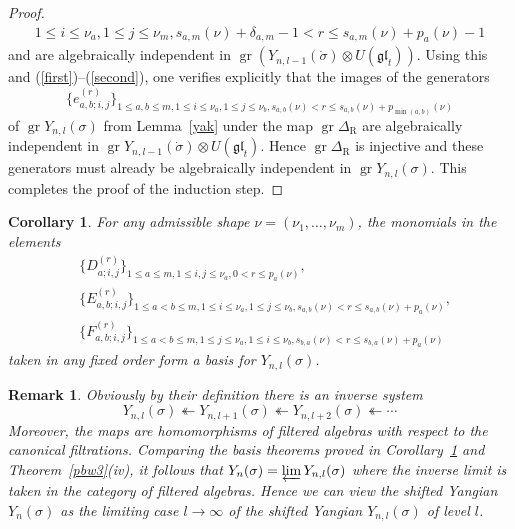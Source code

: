\documentclass[twoside,12pt,reqno]{amsart}
\newtheorem{Corollary}[Proposition]{Corollary}
\newtheorem{Remark}[Proposition]{Remark}
\def\rt{{\operatorname{\scriptscriptstyle R}}}
\def\gr{\operatorname{gr}}
\begin{document}
\begin{proof}
\begin{align*}
{1 \leq i \leq \nu_a, 1 \leq j \leq \nu_m,
s_{a,m}(\nu)+\delta_{a,m}-1 < r \leq s_{a,m}(\nu)+p_a(\nu)-1}
\end{align*}
and are algebraically independent in 
$\gr (Y_{n,l-1}(\dot \sigma) \otimes U(\mathfrak{gl}_t))$.
Using this and (\ref{first})--(\ref{second}), one verifies 
explicitly that the images of the generators
$$
\{e_{a,b;i,j}^{(r)}\}_{1 \leq a,b \leq m, 
1 \leq i \leq \nu_a, 1 \leq j \leq \nu_b, s_{a,b}(\nu) <
r \leq s_{a,b}(\nu) + p_{\min(a,b)}(\nu)}
$$
of $\gr Y_{n,l}(\sigma)$ from Lemma~\ref{yak}
under the map $\gr \Delta_{\rt}$
are algebraically independent
in $\gr Y_{n,l-1}(\dot \sigma) \otimes U(\mathfrak{gl}_t)$. 
Hence $\gr \Delta_{\rt}$ is
injective and these generators must already be algebraically
independent in $\gr Y_{n,l}(\sigma)$. This completes the proof of
the induction step.
\end{proof}

\begin{Corollary}\label{newpbw}
For any admissible shape $\nu = (\nu_1,\dots,\nu_m)$,
the monomials in the elements
\begin{align*}
&\{D_{a;i,j}^{(r)}\}_{1 \leq a \leq m, 1 \leq i,j 
\leq \nu_a, 0 < r \leq p_a(\nu)},\\
&\{E_{a,b;i,j}^{(r)}\}_{1 \leq a < b \leq m,
1 \leq i \leq \nu_a, 1 \leq j \leq \nu_b, s_{a,b}(\nu) < r \leq
s_{a,b}(\nu)+p_a(\nu)},\\
&\{F_{a,b;i,j}^{(r)}\}_{1 \leq a < b \leq m,
1 \leq j \leq \nu_a, 1 \leq i \leq \nu_b, s_{b,a}(\nu) < r \leq
s_{b,a}(\nu)+p_a(\nu)}
\end{align*}
taken in any fixed order form a basis for $Y_{n,l}(\sigma)$.
\end{Corollary}


\begin{Remark}\label{invsys}\rm
Obviously by their definition there is an inverse system
\begin{equation*}
Y_{n,l}(\sigma) \twoheadleftarrow Y_{n,l+1}(\sigma)
\twoheadleftarrow Y_{n,l+2}(\sigma) \twoheadleftarrow \cdots
\end{equation*}
Moreover, the maps are homomorphisms of filtered algebras
with respect to the
canonical filtrations.
Comparing the basis theorems proved in Corollary~\ref{newpbw}
and Theorem~\ref{pbw3}(iv), it follows that
$Y_n(\sigma)
= \varprojlim Y_{n,l}(\sigma)$
where the inverse limit is taken in the category of filtered algebras.
Hence we can view the shifted Yangian
$Y_n(\sigma)$ as the limiting case $l \rightarrow \infty$
of the shifted Yangian $Y_{n,l}(\sigma)$ of level $l$.
\end{Remark}
\end{document}
